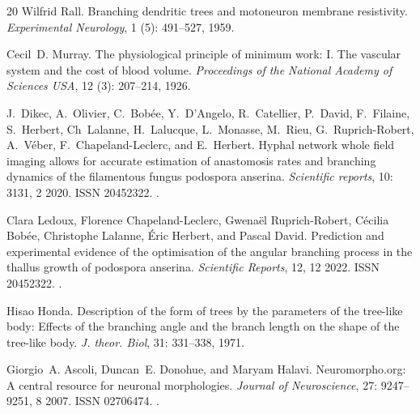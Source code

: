 \documentclass[11pt,a4paper]{article}
\begin{document}
\begin{thebibliography}{20}
Wilfrid Rall.
\newblock Branching dendritic trees and motoneuron membrane resistivity.
\newblock \emph{Experimental Neurology}, 1 (5): 491--527,
  1959.

Cecil~D. Murray.
\newblock The physiological principle of minimum work: {I}. {T}he vascular
  system and the cost of blood volume.
\newblock \emph{Proceedings of the National Academy of Sciences USA},
  12 (3): 207--214, 1926.

J.~Dikec, A.~Olivier, C.~Bobée, Y.~D'Angelo, R.~Catellier, P.~David,
  F.~Filaine, S.~Herbert, Ch~Lalanne, H.~Lalucque, L.~Monasse, M.~Rieu,
  G.~Ruprich-Robert, A.~Véber, F.~Chapeland-Leclerc, and E.~Herbert.
\newblock Hyphal network whole field imaging allows for accurate estimation of
  anastomosis rates and branching dynamics of the filamentous fungus podospora
  anserina.
\newblock \emph{Scientific reports}, 10: 3131, 2 2020.
\newblock ISSN 20452322.
\newblock {}.

Clara Ledoux, Florence Chapeland-Leclerc, Gwenaël Ruprich-Robert, Cécilia
  Bobée, Christophe Lalanne, Éric Herbert, and Pascal David.
\newblock Prediction and experimental evidence of the optimisation of the
  angular branching process in the thallus growth of podospora anserina.
\newblock \emph{Scientific Reports}, 12, 12 2022.
\newblock ISSN 20452322.
\newblock {}.

Hisao Honda.
\newblock Description of the form of trees by the parameters of the tree-like
  body: Effects of the branching angle and the branch length on the shape of
  the tree-like body.
\newblock \emph{J. theor. Biol}, 31: 331--338, 1971.

Giorgio~A. Ascoli, Duncan~E. Donohue, and Maryam Halavi.
\newblock Neuromorpho.org: A central resource for neuronal morphologies.
\newblock \emph{Journal of Neuroscience}, 27: 9247--9251, 8 2007.
\newblock ISSN 02706474.
\newblock {}.


\end{thebibliography}
\end{document}

